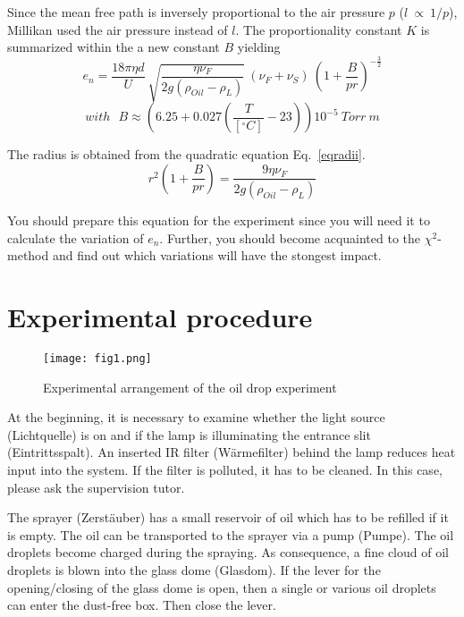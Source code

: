 \documentclass{tudphygp_eng}
\begin{document}
Since the mean free path is inversely proportional to the air pressure $p$ ($l~{\propto}~1/p$), Millikan used the air pressure instead of $l$. The proportionality constant $K$ is summarized within the a new constant $B$ yielding
\begin{equation}
\label{eqoilcorr}
{e_n}= \frac{18{\pi}{\eta}{d}}{U}~\sqrt{\frac{{\eta}{\nu_F}}{2g({\rho_{Oil}}-{\rho_L})}}~({\nu_F}+{\nu_S})~\left(1+\frac{B}{pr}\right)^{-\frac{3}{2}}
\end{equation}
\begin{equation*}
\label{eqoilcorr}
with~~~B\approx\left(6.25+0.027\left(\frac{T}{[{^\circ}C]}-23\right)\right)10^{-5}~Torr~m
\end{equation*}

The radius is obtained from the quadratic equation Eq.~\ref{eqradii}.
\begin{equation}
\label{eqradii}
{r^2}\left(1+\frac{B}{pr}\right)=\frac{9{\eta}{\nu_F}}{2g({\rho_{Oil}}-{\rho_L})}
\end{equation}

You should prepare this equation for the experiment since you will need it to calculate the variation of $e_n$. Further, you should become acquainted to the $\chi^2$-method and find out which variations will have the stongest impact.

\newpage

\section{Experimental procedure}

\begin{figure}[t]
\begin{center}
\texttt{[image: fig1.png]} 
\caption{Experimental arrangement of the oil drop experiment}
\label{fig1}
\end{center}
\end{figure}

At the beginning, it is necessary to examine whether the light source (\grqq{}Lichtquelle\grqq{}) is on and if the lamp is illuminating the entrance slit (\grqq{}Eintrittsspalt\grqq{}). An inserted IR filter (\grqq{}W{\"a}rmefilter\grqq{}) behind the lamp reduces heat input into the system. If the filter is polluted, it has to be cleaned. In this case, please ask the supervision tutor.

The sprayer (\grqq{}Zerst{\"a}uber\grqq{}) has a small reservoir of oil which has to be refilled if it is empty. The oil can be transported to the sprayer via a pump (\grqq{}Pumpe\grqq{}). The oil droplets become charged during the spraying. As consequence, a fine cloud of oil droplets is blown into the glass dome (\grqq{}Glasdom\grqq{}). If the lever for the opening/closing of the glass dome is open, then a single or various oil droplets can enter the dust-free box. Then close the lever.
\end{document}
